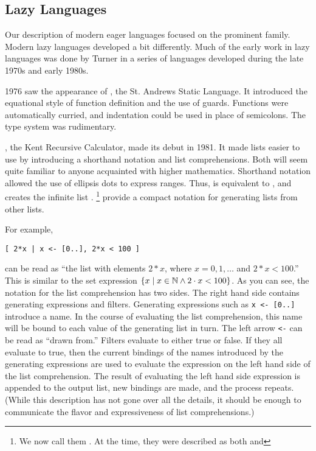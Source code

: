 \subsection{Lazy Languages}
Our description of modern eager languages focused on the prominent  family. Modern lazy languages developed a bit differently. Much of the early work in lazy languages was done by Turner in a series of languages developed during the late 1970s and early 1980s.

1976 saw the appearance of , the St. Andrews Static Language. It introduced the equational style of function definition and the use of guards. Functions were automatically curried, and indentation could be used in place of semicolons. The type system was rudimentary.

, the Kent Recursive Calculator, made its debut in 1981. It made lists easier to use by introducing a shorthand notation and list comprehensions. Both will seem quite familiar to anyone acquainted with higher mathematics. Shorthand notation allowed the use of ellipsis dots to express ranges. Thus, \code{[1..5]} is equivalent to \code{[1, 2, 3, 4, 5]}, and \code{[1..]} creates the infinite list \code{[1, 2, 3, 4..]}. \footnote{We now call them . At the time, they were described as both  and } provide a compact notation for generating lists from other lists.

For example,
\begin{lstlisting}
[ 2*x | x <- [0..], 2*x < 100 ]
\end{lstlisting}
can be read as ``the list with elements $2 * x$, where $x = 0, 1, \dotsc$ and $2 * x < 100$.'' This is similar to the set expression $\left\{ x \mid x \in \mathbb{N} \land 2\cdot x < 100 \right\}$. As you can see, the notation for the list comprehension has two sides. The right hand side contains generating expressions and filters. Generating expressions such as \lstinline{x <- [0..]} introduce a name. In the course of evaluating the list comprehension, this name will be bound to each value of the generating list in turn. The left arrow \lstinline{<-} can be read as ``drawn from.'' Filters evaluate to either true or false. If they all evaluate to true, then the current bindings of the names introduced by the generating expressions are used to evaluate the expression on the left hand side of the list comprehension. The result of evaluating the left hand side expression is appended to the output list, new bindings are made, and the process repeats. (While this description has not gone over all the details, it should be enough to communicate the flavor and expressiveness of list comprehensions.)

